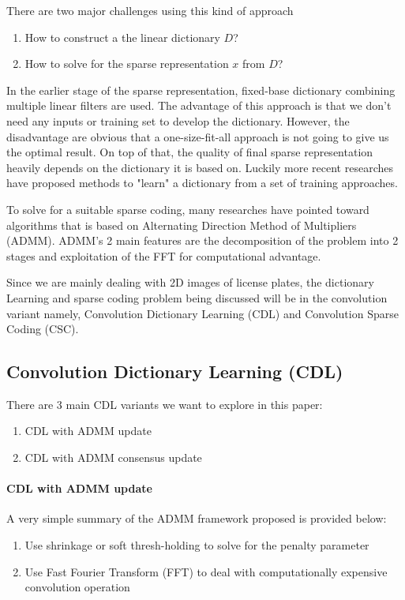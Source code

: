 There are two major challenges using this kind of approach
\begin{enumerate}
    \item How to construct a the linear dictionary $D$?
    \item How to solve for the sparse representation $x$ from $D$?
\end{enumerate}

In the earlier stage of the sparse representation, fixed-base dictionary 
combining multiple linear filters are used\cite{5452966}. 
The advantage of this approach is that we don't need
any inputs or training set to develop the dictionary. However, the disadvantage
are obvious that a one-size-fit-all approach is not going to give us the 
optimal result. On top of that, the quality of final sparse representation 
heavily depends on the dictionary it is based on. Luckily more recent researches
have proposed methods to "learn" a dictionary from a set of training approaches.

To solve for a suitable sparse coding, many researches have pointed toward
algorithms that is based on Alternating Direction Method of Multipliers
(ADMM)\cite{CDLreview2018}. ADMM's 2 main features are the decomposition 
of the problem into 2 stages and exploitation of the FFT for computational 
advantage.

Since we are mainly dealing with 2D images of license plates, the dictionary Learning
and sparse coding problem being discussed will be in the convolution variant namely,
Convolution Dictionary Learning (CDL) and Convolution Sparse Coding (CSC).

\subsection{Convolution Dictionary Learning (CDL)}
There are 3 main CDL variants we want to explore in this paper:
\begin{enumerate}
    \item CDL with ADMM update\cite{SOREL201644}
    \item CDL with ADMM consensus update\cite{SOREL201644,CDLreview2018}
\end{enumerate}

\paragraph{CDL with ADMM update}
A very simple summary of the ADMM framework proposed is provided below:
\begin{enumerate}
    \item Use shrinkage or soft thresh-holding to solve for the penalty parameter
    \item Use Fast Fourier Transform (FFT) to deal with computationally expensive convolution
    operation
\end{enumerate}

